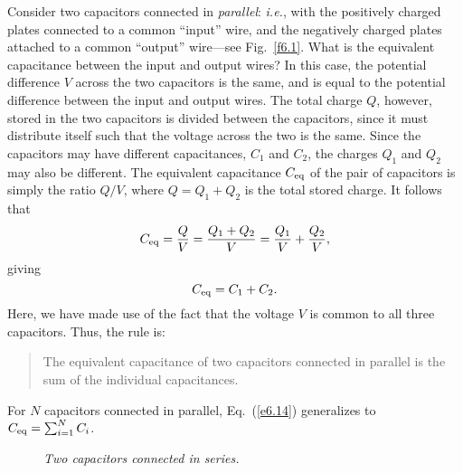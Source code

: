 Consider two capacitors connected in {\em parallel}: {\em i.e.}, with the
positively charged plates connected to a common ``input'' wire, and the negatively
charged plates attached to a common ``output'' wire---see Fig.~\ref{f6.1}. What is the equivalent capacitance
between the input and output wires? In this case, the potential
difference $V$ across the two capacitors is the same, and is equal to
the potential difference between the input and output wires. The total charge
$Q$, however, stored in the two capacitors is divided between the 
capacitors, since it must distribute itself such that the voltage across the
two is the same. Since the capacitors may have different capacitances, $C_1$ and $C_2$,
the charges $Q_1$ and $Q_2$ may also be different. The equivalent capacitance
$C_{\rm eq}$ of the pair of capacitors is simply the ratio $Q/V$, where
$Q=Q_1+Q_2$ is the total stored  charge. It follows that
\begin{equation}
C_{\rm eq} = \frac{Q}{V} = \frac{Q_1+Q_2}{V} = \frac{Q_1}{V} + \frac{Q_2}{V},
\end{equation}
giving
\begin{equation}\label{e6.14}
C_{\rm eq} = C_1 + C_2.
\end{equation}
Here, we have made use of the fact that the voltage $V$ is common to all three
capacitors. Thus, the rule is:
\begin{quote}
{\sf The equivalent capacitance of two capacitors connected in parallel
is the sum of the individual capacitances.}
\end{quote}
For $N$ capacitors connected in parallel, Eq.~(\ref{e6.14}) generalizes  to $C_{\rm eq} = \sum_{i=1}^N C_i$. 

\begin{figure}[h]
\epsfysize=1in
\centerline{}
\caption{\em Two capacitors connected in series.}\label{f6.2}
\end{figure}

